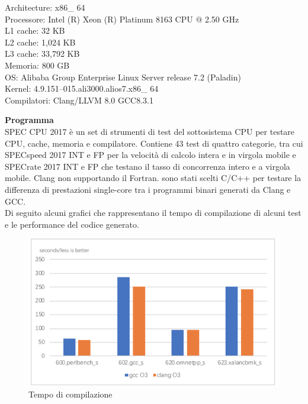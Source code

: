 \documentclass[12pt,a4paper]{report}
\begin{document}
Architecture: x86\_ 64 \\
Processore: Intel (R) Xeon (R) Platinum 8163 CPU @ 2.50 GHz\\
L1 cache: 32 KB\\
L2 cache: 1,024 KB\\
L3 cache: 33,792 KB\\
Memoria: 800 GB\\
OS: Alibaba Group Enterprise Linux Server release 7.2 (Paladin)\\
Kernel: 4.9.151–015.ali3000.alios7.x86\_ 64\\
Compilatori: Clang/LLVM 8.0 GCC8.3.1\\


\textbf{Programma}\\
SPEC CPU 2017 è un set di strumenti di test del sottosistema CPU per testare CPU, cache, memoria e compilatore. Contiene 43 test di quattro categorie, tra cui SPECspeed 2017 INT e FP per la velocità  di calcolo intera e in virgola mobile e SPECrate 2017 INT e FP che testano il tasso di concorrenza intero e a virgola mobile. Clang non supportando il Fortran. sono stati scelti C/C++ per testare la differenza di prestazioni single-core tra i programmi binari generati da Clang e GCC.\\
Di seguito alcuni grafici che rappresentano il tempo di compilazione di alcuni test e le performance del codice generato.

\begin{figure}[h]
\centering
 \includegraphics[scale=0.4]{CompilatoriGrafici/timeComparison.png}
 \caption{Tempo di compilazione}
 \label{Fig:Tempo di compilazione}
\end{figure}
\end{document}
